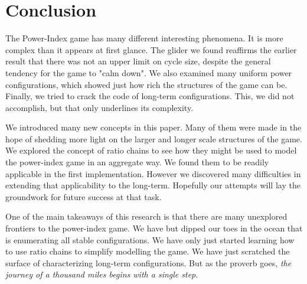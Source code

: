 \documentclass[12pt]{article}
\theoremstyle{definition}
\theoremstyle{remark}
\theoremstyle{remark}
\begin{document}



\section{Conclusion}
\par
The Power-Index game has many different interesting phenomena. It is more complex than it appears at first glance. The glider we found reaffirms the earlier result that there was not an upper limit on cycle size, despite the general tendency for the game to "calm down". We also examined many uniform power configurations, which showed just how rich the structures of the game can be. Finally, we tried to crack the code of long-term configurations. This, we did not accomplish, but that only underlines its complexity.

\par
We introduced many new concepts in this paper. Many of them were made in the hope of shedding more light on the larger and longer scale structures of the game. We explored the concept of ratio chains to see how they might be used to model the power-index game in an aggregate way. We found them to be readily applicable in the first implementation. However we discovered many difficulties in extending that applicability to the long-term. Hopefully our attempts will lay the groundwork for future success at that task.

\par
One of the main takeaways of this research is that there are many unexplored frontiers to the power-index game. We have but dipped our toes in the ocean that is enumerating all stable configurations. We have only just started learning how to use ratio chains to simplify modelling the game. We have just scratched the surface of characterizing long-term configurations. But as the proverb goes, \emph{the journey of a thousand miles begins with a single step}.

% 
\end{document}
